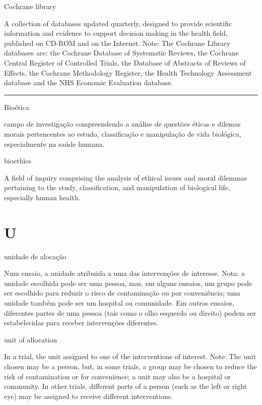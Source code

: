 \documentclass[
]{book}
\begin{document}
Cochrane library

A collection of databases updated quarterly, designed to provide scientific information and evidence to support decision making in the health field, published on CD-ROM and on the Internet. Note: The Cochrane Library databases are: the Cochrane Database of Systematic Reviews, the Cochrane Central Register of Controlled Trials, the Database of Abstracts of Reviews of Effects, the Cochrane Methodology Register, the Health Technology Assessment database and the NHS Economic Evaluation database.

\begin{center}\rule{0.5\linewidth}{0.5pt}\end{center}

Bioética

campo de investigação compreendendo a análise de questões éticas e dilemas morais pertencentes ao estudo, classificação e manipulação de vida biológica, especialmente na saúde humana.

bioethics

A field of inquiry comprising the analysis of ethical issues and moral dilemmas pertaining to the study, classification, and manipulation of biological life, especially human health.

\hypertarget{u}{%
\chapter*{U}\label{u}}

unidade de alocação

Num ensaio, a unidade atribuida a uma das intervenções de interesse. Nota: a unidade escolhida pode ser uma pessoa, mas, em alguns ensaios, um grupo pode ser escolhido para reduzir o risco de contaminação ou por conveniência; uma unidade também pode ser um hospital ou comunidade. Em outros ensaios, diferentes partes de uma pessoa (tais como o olho esquerdo ou direito) podem ser estabelecidas para receber intervenções diferentes.

unit of allocation

In a trial, the unit assigned to one of the interventions of interest. Note: The unit chosen may be a person, but, in some trials, a group may be chosen to reduce the risk of contamination or for convenience; a unit may also be a hospital or community. In other trials, different parts of a person (such as the left or right eye) may be assigned to receive different interventions.
\end{document}

